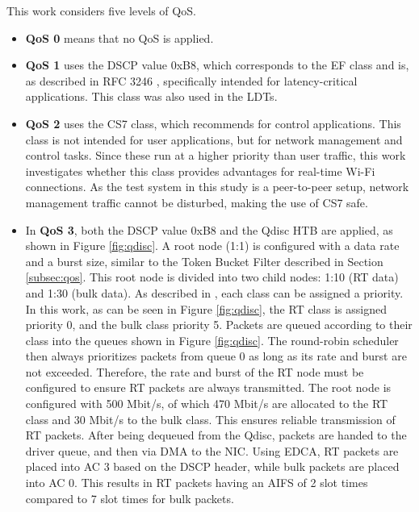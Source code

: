 This work considers five levels of \ac{QoS}.  
\begin{itemize}  
    \item \textbf{\ac{QoS} 0} means that no \ac{QoS} is applied.  
    \item \textbf{\ac{QoS} 1} uses the \ac{DSCP} value 0xB8, which corresponds to the \ac{EF} class and is, as described in RFC 3246 \cite{rfc3246}, specifically intended for latency-critical applications.  
          This class was also used in the \acp{LDT}.
    \item \textbf{\ac{QoS} 2} uses the CS7 class, which \cite[p. 27]{rfc4594} recommends for control applications.  
          This class is not intended for user applications, but for network management and control tasks.  
          Since these run at a higher priority than user traffic, this work investigates whether this class provides advantages for real-time Wi-Fi connections.  
          As the test system in this study is a peer-to-peer setup, network management traffic cannot be disturbed, making the use of CS7 safe.  
    \item In \textbf{\ac{QoS} 3}, both the \ac{DSCP} value 0xB8 and the \ac{Qdisc} \ac{HTB} are applied, as shown in Figure \ref{fig:qdisc}.  
          A root node (1:1) is configured with a data rate and a burst size, similar to the Token Bucket Filter described in Section \ref{subsec:qos}.  
          This root node is divided into two child nodes: 1:10 (RT data) and 1:30 (bulk data).  
          As described in \cite{htb}, each class can be assigned a priority.  
          In this work, as can be seen in Figure \ref{fig:qdisc}, the RT class is assigned priority 0, and the bulk class priority 5.  
          Packets are queued according to their class into the queues shown in Figure \ref{fig:qdisc}.  
          The round-robin scheduler then always prioritizes packets from queue 0 as long as its rate and burst are not exceeded.  
          Therefore, the rate and burst of the RT node must be configured to ensure RT packets are always transmitted.  
          The root node is configured with 500 Mbit/s, of which 470 Mbit/s are allocated to the RT class and 30 Mbit/s to the bulk class.  
          This ensures reliable transmission of RT packets.  
          After being dequeued from the \ac{Qdisc}, packets are handed to the driver queue, and then via \ac{DMA} to the \ac{NIC}.  
          Using \ac{EDCA}, RT packets are placed into \ac{AC} 3 based on the \ac{DSCP} header, while bulk packets are placed into \ac{AC} 0.  
          This results in RT packets having an \ac{AIFS} of 2 slot times compared to 7 slot times for bulk packets.  

\end{itemize}
